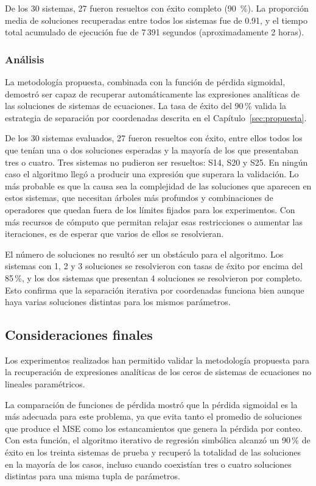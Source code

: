 \documentclass[12pt,a4paper]{article} \usepackage[utf8]{inputenc} \usepackage[spanish]{babel} \usepackage{amsmath, amssymb, amsthm} \usepackage{bm} \usepackage{float} \usepackage{longtable} \usepackage[hidelinks]{hyperref}
\begin{document}
De los 30 sistemas, 27 fueron resueltos con éxito completo (90~\%). La proporción media de soluciones recuperadas entre todos los sistemas fue de 0.91, y el tiempo total acumulado de ejecución fue de 7\,391 segundos (aproximadamente 2 horas).

\subsubsection{Análisis}

La metodología propuesta, combinada con la función de pérdida sigmoidal, demostró ser capaz de recuperar automáticamente las expresiones analíticas de las soluciones de sistemas de ecuaciones. La tasa de éxito del 90\,\% valida la estrategia de separación por coordenadas descrita en el Capítulo~\ref{sec:propuesta}.

De los 30 sistemas evaluados, 27 fueron resueltos con éxito, entre ellos todos los que tenían una o dos soluciones esperadas y la mayoría de los que presentaban tres o cuatro. Tres sistemas no pudieron ser resueltos: S14, S20 y S25. En ningún caso el algoritmo llegó a producir una expresión que superara la validación. Lo más probable es que la causa sea la complejidad de las soluciones que aparecen en estos sistemas, que necesitan árboles más profundos y combinaciones de operadores que quedan fuera de los límites fijados para los experimentos. Con más recursos de cómputo que permitan relajar esas restricciones o aumentar las iteraciones, es de esperar que varios de ellos se resolvieran.

El número de soluciones no resultó ser un obstáculo para el algoritmo. Los sistemas con 1, 2 y 3 soluciones se resolvieron con tasas de éxito por encima del 85\,\%, y los dos sistemas que presentan 4 soluciones se resolvieron por completo. Esto confirma que la separación iterativa por coordenadas funciona bien aunque haya varias soluciones distintas para los mismos parámetros.

\subsection{Consideraciones finales}
\label{sec:conclusiones_capitulo}

Los experimentos realizados han permitido validar la metodología propuesta para la recuperación de expresiones analíticas de los ceros de sistemas de ecuaciones no lineales paramétricos.

La comparación de funciones de pérdida mostró que la pérdida sigmoidal es la más adecuada para este problema, ya que evita tanto el promedio de soluciones que produce el MSE como los estancamientos que genera la pérdida por conteo. Con esta función, el algoritmo iterativo de regresión simbólica alcanzó un 90\,\% de éxito en los treinta sistemas de prueba y recuperó la totalidad de las soluciones en la mayoría de los casos, incluso cuando coexistían tres o cuatro soluciones distintas para una misma tupla de parámetros.
\end{document}

